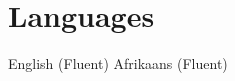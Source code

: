 \documentclass[a4paper,online,extended]{adcv}
\begin{document}

\section{Languages}

English (Fluent) \quad Afrikaans (Fluent)
\end{document}
